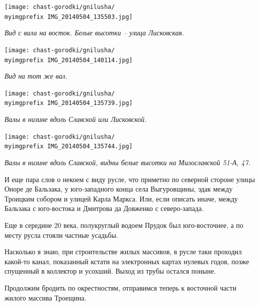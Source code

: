 \newpage

\begin{center}
\texttt{[image: chast-gorodki/gnilusha/\\myimgprefix IMG\_20140504\_135503.jpg]}

\textit{Вид с вала на восток. Белые высотки – улица Лисковская.}
\end{center}


\begin{center}
\texttt{[image: chast-gorodki/gnilusha/\\myimgprefix IMG\_20140504\_140114.jpg]}

\textit{Вид на тот же вал.}
\end{center}

\newpage


\begin{center}
\texttt{[image: chast-gorodki/gnilusha/\\myimgprefix IMG\_20140504\_135739.jpg]}

\textit{Валы в низине вдоль Славской или Лисковской.}
\end{center}

\begin{center}
\texttt{[image: chast-gorodki/gnilusha/\\myimgprefix IMG\_20140504\_135744.jpg]}

\textit{Валы в низине вдоль Славской, видны белые высотки на Милославской 51-А, 47.}
\end{center}
\newpage

%
%

И еще пара слов о некоем с виду русле, что приметно по северной стороне улицы Оноре де Бальзака, у юго-западного конца села Выгуровщины, эдак между Троицким собором и улицей Карла Маркса. Или, если описать иначе, между Бальзака с юго-востока и Дмитрова да Довженко с северо-запада.

Еще в середине 20 века, полукруглый водоем Прудок был юго-восточнее, а по месту русла стояли частные усадьбы.

Насколько я знаю, при строительстве жилых массивов, в русле таки проходил какой-то канал, показанный кстати на электронных картах нулевых годов, позже спущенный в коллектор и усохший. Выход из трубы остался поныне.

Продолжим бродить по окрестностям, отправимся теперь к восточной части жилого массива Троещина.

